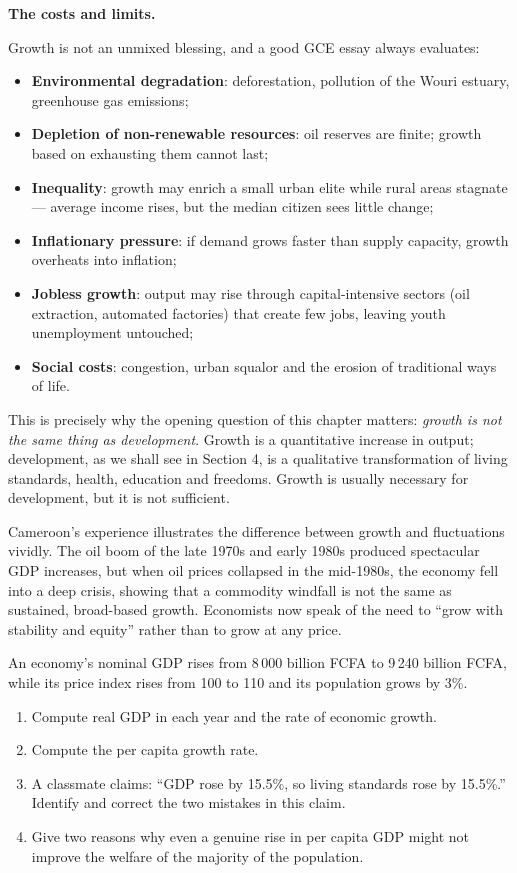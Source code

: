 \documentclass[11pt]{article}
\begin{document}
\textbf{The costs and limits.}\par
Growth is not an unmixed blessing, and a good GCE essay always evaluates:
\begin{itemize}
\item \textbf{Environmental degradation}: deforestation, pollution of the Wouri estuary, greenhouse gas emissions;
\item \textbf{Depletion of non-renewable resources}: oil reserves are finite; growth based on exhausting them cannot last;
\item \textbf{Inequality}: growth may enrich a small urban elite while rural areas stagnate --- average income rises, but the median citizen sees little change;
\item \textbf{Inflationary pressure}: if demand grows faster than supply capacity, growth overheats into inflation;
\item \textbf{Jobless growth}: output may rise through capital-intensive sectors (oil extraction, automated factories) that create few jobs, leaving youth unemployment untouched;
\item \textbf{Social costs}: congestion, urban squalor and the erosion of traditional ways of life.
\end{itemize}

This is precisely why the opening question of this chapter matters: \emph{growth is not the same thing as development}. Growth is a quantitative increase in output; development, as we shall see in Section 4, is a qualitative transformation of living standards, health, education and freedoms. Growth is usually necessary for development, but it is not sufficient.

\begin{savaistu}
Cameroon's experience illustrates the difference between growth and fluctuations vividly. The oil boom of the late 1970s and early 1980s produced spectacular GDP increases, but when oil prices collapsed in the mid-1980s, the economy fell into a deep crisis, showing that a commodity windfall is not the same as sustained, broad-based growth. Economists now speak of the need to ``grow with stability and equity'' rather than to grow at any price.
\end{savaistu}

\begin{exercice}
An economy's nominal GDP rises from 8\,000 billion FCFA to 9\,240 billion FCFA, while its price index rises from 100 to 110 and its population grows by 3\%.
\begin{enumerate}
\item Compute real GDP in each year and the rate of economic growth.
\item Compute the per capita growth rate.
\item A classmate claims: ``GDP rose by 15.5\%, so living standards rose by 15.5\%.'' Identify and correct the two mistakes in this claim.
\item Give two reasons why even a genuine rise in per capita GDP might not improve the welfare of the majority of the population.
\end{enumerate}
\end{exercice}
\end{document}
